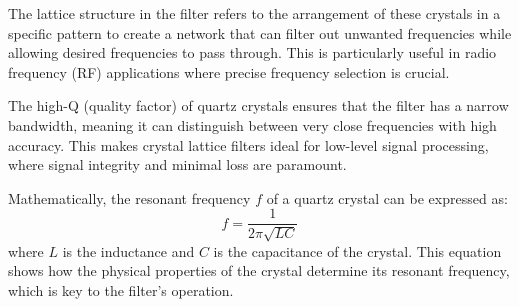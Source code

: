 The lattice structure in the filter refers to the arrangement of these crystals in a specific pattern to create a network that can filter out unwanted frequencies while allowing desired frequencies to pass through. This is particularly useful in radio frequency (RF) applications where precise frequency selection is crucial.

The high-Q (quality factor) of quartz crystals ensures that the filter has a narrow bandwidth, meaning it can distinguish between very close frequencies with high accuracy. This makes crystal lattice filters ideal for low-level signal processing, where signal integrity and minimal loss are paramount.

Mathematically, the resonant frequency \( f \) of a quartz crystal can be expressed as:
\[
f = \frac{1}{2\pi \sqrt{LC}}
\]
where \( L \) is the inductance and \( C \) is the capacitance of the crystal. This equation shows how the physical properties of the crystal determine its resonant frequency, which is key to the filter's operation.

